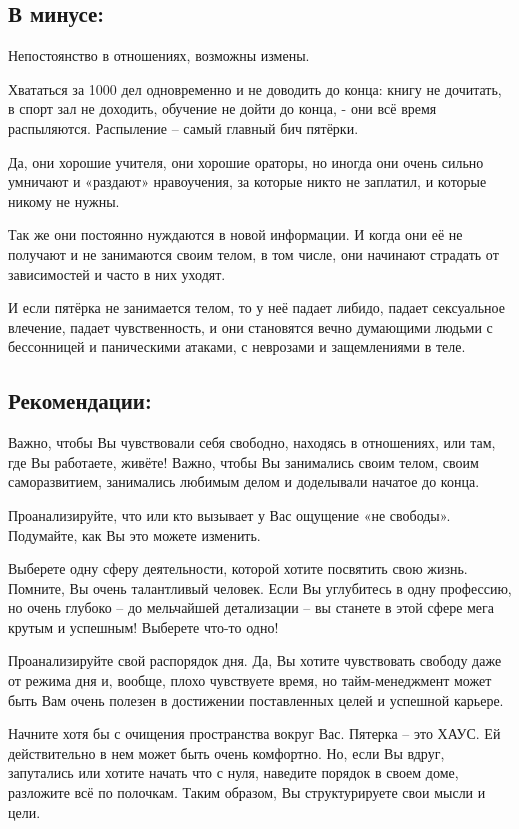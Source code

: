 \subsection{В минусе:}
\item Непостоянство в отношениях, возможны измены.
\item Хвататься за 1000 дел одновременно и не доводить до конца: книгу не дочитать, в спорт зал не доходить, обучение не дойти до конца, - они всё время распыляются. Распыление – самый главный бич пятёрки.
\item Да, они хорошие учителя, они хорошие ораторы, но иногда они очень сильно умничают и «раздают» нравоучения, за которые никто не заплатил, и которые никому не нужны.
\item Так же они постоянно нуждаются в новой информации. И когда они её не получают и не занимаются своим телом, в том числе, они начинают страдать от зависимостей и часто в них уходят.
\item И если пятёрка не занимается телом, то у неё падает либидо, падает сексуальное влечение, падает чувственность, и они становятся вечно думающими людьми с бессонницей и паническими атаками, с неврозами и защемлениями в теле.
\endsubsection

\subsection{Рекомендации:}
\item Важно, чтобы Вы чувствовали себя свободно, находясь в отношениях, или там, где Вы работаете, живёте! Важно, чтобы Вы занимались своим телом, своим саморазвитием, занимались любимым делом и доделывали начатое до конца.
\item Проанализируйте, что или кто вызывает у Вас ощущение «не свободы». Подумайте, как Вы это можете изменить.
\item Выберете одну сферу деятельности, которой хотите посвятить свою жизнь. Помните, Вы очень талантливый человек. Если Вы углубитесь в одну профессию, но очень глубоко – до мельчайшей детализации – вы станете в этой сфере мега крутым и успешным! Выберете что-то одно!
\item Проанализируйте свой распорядок дня. Да, Вы хотите чувствовать свободу даже от режима дня и, вообще, плохо чувствуете время, но тайм-менеджмент может быть Вам очень полезен в достижении поставленных целей и успешной карьере.
\item Начните хотя бы с очищения пространства вокруг Вас. Пятерка – это ХАУС. Ей действительно в нем может быть очень комфортно. Но, если Вы вдруг, запутались или хотите начать что с нуля, наведите порядок в своем доме, разложите всё по полочкам. Таким образом, Вы структурируете свои мысли и цели.
\endsubsection

